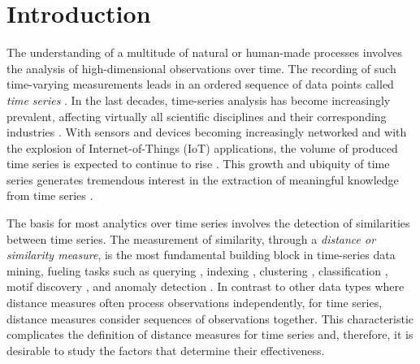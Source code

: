 \documentclass[11pt]{article}
\begin{document}
\section{Introduction}
\label{john_sec:intro}

The understanding of a multitude of natural or human-made processes involves the analysis of high-dimensional observations over time.  The recording of such time-varying measurements leads in an ordered sequence of data points called {\em time series} \cite{palpanas2015data,paparrizos2018fast}. In the last decades, time-series analysis has become increasingly prevalent, affecting virtually all scientific disciplines and their corresponding industries \cite{UCRArchive2018,liu2023amir,krishnan2019artificial,paparrizos2016detecting,paparrizos2016screening,mckeown2016predicting,goel2016social}. With sensors and devices becoming increasingly networked and with the explosion of Internet-of-Things (IoT) applications, the volume of produced time series is expected to continue to rise \cite{mahdavinejad2017machine,paparrizos2021vergedb,jiang2020pids,jiang2021good,liu2021decomposed}. This growth and ubiquity of time series generates tremendous interest in the extraction of meaningful knowledge from time series \cite{dziedzic2019band,paparrizos2019grail}.


The basis for most analytics over time series involves the detection of similarities between time series. The measurement of similarity, through a {\em distance or similarity measure}, is the most fundamental building block in time-series data mining, fueling tasks such as querying \cite{agrawal1993,ding2008querying,paparrizos2023accelerating,paparrizos2022fast}, indexing \cite{echihabi2018lernaean,Keogh2001locally,zoumpatianos2016ads}, clustering \cite{paparrizos2023odyssey,keogh2005clustering,paparrizos2015k,paparrizos2017fast,bariya2021k}, classification \cite{bagnall2017great,paparrizos2019grail,ratanamahatana2004making,ye2009time}, motif discovery \cite{mueen2009exact,linardi2018scalable,yeh2016matrix}, and anomaly detection \cite{dallachiesa2014top,paparrizos2022tsb,paparrizos2022volume,boniol2021sand,boniol2022theseus,boniol2021sandaction,boniol2023edbt,sylligardos2023choose}. In contrast to other data types where distance measures often process observations independently, for time series, distance measures consider sequences of observations together. This characteristic complicates the definition of distance measures for time series and, therefore, it is desirable to study the factors that determine their effectiveness.
\end{document}
